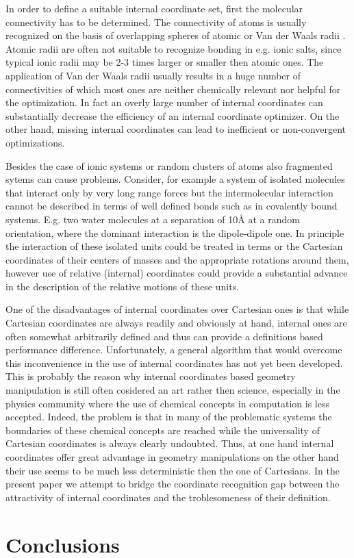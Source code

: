 \documentclass[prl,aps,preprint,superbib,12pt]{revtex4}
\begin{document}
In order to define a suitable internal coordinate set, first
the molecular connectivity has to be determined.
The connectivity of atoms is usually recognized on the basis of 
overlapping spheres of atomic or Van der Waals radii 
\cite{VBakken02,TBucko05,KNemeth04}. Atomic radii are often not suitable
to recognize bonding in e.g. ionic salts, since typical ionic radii
may be 2-3 times larger or smaller then atomic ones. The application
of Van der Waals radii usually results in a huge number of 
connectivities of which most ones are neither chemically relevant nor 
helpful for the optimization. In fact an overly large number
of internal coordinates can substantially decrease the efficiency of
an internal coordinate optimizer. On the other hand, missing internal 
coordinates can lead to inefficient or non-convergent optimizations.

Besides the case of ionic systems or random clusters of atoms
also fragmented sytems can cause problems. Consider, for example
a system of isolated molecules that interact only by very long range
forces but the intermolecular interaction cannot be described
in terms of well defined bonds such as in covalently bound systems.
E.g. two water molecules at a separation of 10{\AA} at a random 
orientation, where the dominant interaction is the dipole-dipole one.
In principle the interaction of these isolated units could be treated
in terms or the Cartesian coordinates of their centers of masses
and the appropriate rotations around them, however use of 
relative (internal) coordinates could provide a substantial advance
in the description of the relative motions of these units.

One of the disadvantages of internal coordinates over Cartesian ones
is that while Cartesian coordinates are always readily and
obviously at hand,
internal ones are often somewhat arbitrarily defined and thus
can provide a definitions based performance difference. Unfortunately,
a general algorithm that would overcome this inconvenience in the use
of internal coordinates has not yet been developed. This is probably
the reason why internal coordinates based geometry manipulation
is still often cosidered an art rather then science, especially
in the physics community where the use of chemical concepts in 
computation is less accepted. Indeed, the problem is that in many of the
problematic systems the boundaries of these chemical concepts are 
reached while the universality of Cartesian coordinates is always 
clearly undoubted. Thus, at one hand internal coordinates offer
great advantage in geometry manipulations on the other hand their
use seems to be much less deterministic then the one of Cartesians.
In the present paper we attempt to bridge the coordinate recognition
gap between the attractivity of internal coordinates and the 
troblesomeness of their definition.



\section{Conclusions} \label{Conclusions}


\end{document}
